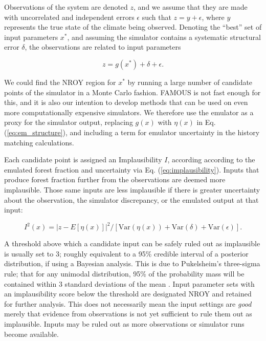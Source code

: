 \documentclass[esd, manuscript]{copernicus}
\begin{document}
Observations of the system are denoted $z$, and we assume that they are made with uncorrelated and independent errors $\epsilon$ such that $z=y+\epsilon$, where $y$ represents the true state of the climate being observed. Denoting the ``best'' set of input parameters $x^{*}$, and assuming the simulator contains a systematic structural error $\delta$, the observations are related to input parameters

\begin{equation}\label{eq:em_structure}
z=g(x^*) + \delta + \epsilon.
\end{equation}

We could find the NROY region for $x^{*}$ by running a large number of candidate points of the simulator in a Monte Carlo fashion. FAMOUS is not fast enough for this, and it is also our intention to develop methods that can be used on even more computationally expensive simulators. We therefore use the emulator as a proxy for the simulator output, replacing $g(x)$ with $\eta(x)$ in Eq. (\ref{eq:em_structure}), and including a term for emulator uncertainty in the history matching calculations.

Each candidate point is assigned an Implausibility $I$, according according to the emulated forest fraction and uncertainty via Eq. (\ref{eq:implausibility}). Inputs that produce forest fraction further from the observations are deemed more implausible. Those same inputs are less implausible if there is greater uncertainty about the observation, the simulator discrepancy, or the emulated output at that input:

\begin{equation}\label{eq:implausibility}
I^{2}(x)=  |z -E[\eta(x)]|^{2} / [\textrm{Var}(\eta(x)) +\textrm{Var}(\delta) +\textrm{Var}(\epsilon)].
\end{equation}

A threshold above which a candidate input can be safely ruled out as implausible is usually set to 3; roughly equivalent to a 95\% credible interval of a posterior distribution, if using a Bayesian analysis. This is due to Pukelsheim's three-sigma rule; that for any unimodal distribution, 95\% of the probability mass will be contained within 3 standard deviations of the mean \citep{pukelsheim1994three}. Input parameter sets with an implausibility score below the threshold are designated NROY and retained for further analysis. This does not necessarily mean the input settings are \emph{good} merely that evidence from observations is not yet sufficient to rule them out as implausible. Inputs may be ruled out as more observations or simulator runs become available.
\end{document}
